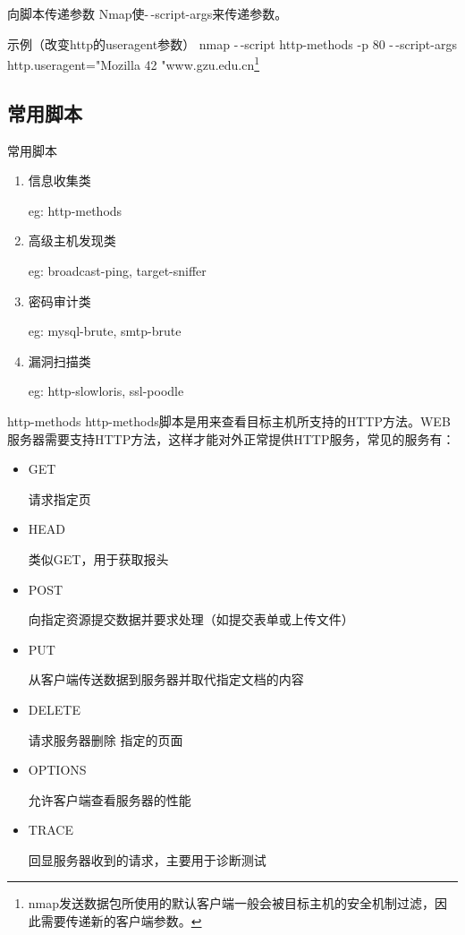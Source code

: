 \documentclass{beamer}
\begin{document}
\begin{frame}{向脚本传递参数}
Nmap使-\,-script-args来传递参数。
\begin{block}{示例（改变http的useragent参数）}
nmap -\,-script http-methods -p 80 -\,-script-args http.useragent="Mozilla 42 "www.gzu.edu.cn\footnote{nmap发送数据包所使用的默认客户端一般会被目标主机的安全机制过滤，因此需要传递新的客户端参数。} 
\end{block}
\end{frame}
\subsection{常用脚本}
\begin{frame}
\end{frame}
\begin{frame}{常用脚本}
\begin{enumerate}
\item 信息收集类

eg: http-methods
\item 高级主机发现类

eg: broadcast-ping, target-sniffer
\item 密码审计类

eg: mysql-brute, smtp-brute
\item 漏洞扫描类

eg: http-slowloris, ssl-poodle
\end{enumerate}
\end{frame}
\begin{frame}
\end{frame}
\begin{frame}{http-methods}
http-methods脚本是用来查看目标主机所支持的HTTP方法。WEB服务器需要支持HTTP方法，这样才能对外正常提供HTTP服务，常见的服务有：
\begin{itemize}
\item GET

请求指定页
\item HEAD

类似GET，用于获取报头
\item POST

向指定资源提交数据并要求处理（如提交表单或上传文件）
\item PUT

从客户端传送数据到服务器并取代指定文档的内容
\item DELETE

请求服务器删除 指定的页面
\item OPTIONS

允许客户端查看服务器的性能
\item TRACE

回显服务器收到的请求，主要用于诊断测试
\end{itemize}
\end{frame}
\end{document}
